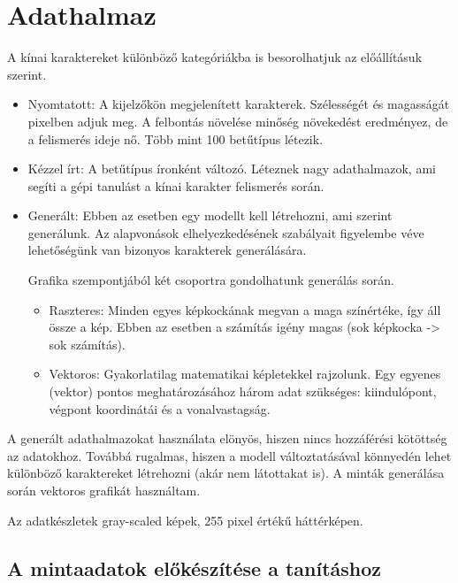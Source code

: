 
\section{Adathalmaz}

A kínai karaktereket különböző kategóriákba is besorolhatjuk az előállításuk szerint.
\begin{itemize}
\item Nyomtatott: A kijelzőkön megjelenített karakterek. Szélességét és magasságát pixelben adjuk meg. A felbontás növelése minőség növekedést eredményez, de a felismerés ideje nő. Több mint 100 betűtípus létezik.
\item Kézzel írt: A betűtípus íronként változó. Léteznek nagy adathalmazok, ami segíti a gépi tanulást a kínai karakter felismerés során.
\item Generált: Ebben az esetben egy modellt kell létrehozni, ami szerint generálunk. Az alapvonások elhelyezkedésének szabályait figyelembe véve lehetőségünk van bizonyos karakterek generálására.

Grafika szempontjából két csoportra gondolhatunk generálás során.
	\begin{itemize}
	\item Raszteres: Minden egyes képkockának megvan a maga színértéke, így áll össze a kép. Ebben az esetben a számítás igény magas (sok képkocka -> sok számítás).
	\item Vektoros: Gyakorlatilag matematikai képletekkel rajzolunk. Egy egyenes (vektor) pontos meghatározásához három adat szükséges: kiindulópont, végpont koordinátái és a vonalvastagság.
	\end{itemize}
\end{itemize}

A generált adathalmazokat használata elönyös, hiszen nincs hozzáférési kötöttség az adatokhoz. Továbbá rugalmas, hiszen a modell változtatásával könnyedén lehet különböző karaktereket létrehozni (akár nem látottakat is). A minták generálása során vektoros grafikát használtam.

Az adatkészletek gray-scaled képek, 255 pixel értékű háttérképen.

\subsection{A mintaadatok előkészítése a tanításhoz}

